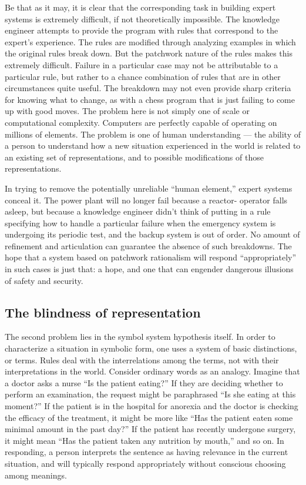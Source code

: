 \documentclass[12pt]{article}
\begin{document}
Be that as it may, it is clear that the corresponding task in building expert systems is extremely difficult, if not theoretically impossible. The knowledge engineer attempts to provide the program with rules that correspond to the expert's experience. The rules are modified through analyzing examples in which the original rules break down. But the patchwork nature of the rules makes this extremely difficult. Failure in a particular case may not be attributable to a particular rule, but rather to a chance combination of rules that are in other circumstances quite useful. The breakdown may not even provide sharp criteria for knowing what to change, as with a chess program that is just failing to come up with good moves. The problem here is not simply one of scale or computational complexity. Computers are perfectly capable of operating on millions of elements. The problem is one of human understanding --- the ability of a person to understand how a new situation experienced in the world is related to an existing set of representations, and to possible modifications of those representations.

In trying to remove the potentially unreliable ``human element,'' expert systems conceal it. The power plant will no longer fail because a reactor- operator falls asleep, but because a knowledge engineer didn't think of putting in a rule specifying how to handle a particular failure when the emergency system is undergoing its periodic test, and the backup system is out of order. No amount of refinement and articulation can guarantee the absence of such breakdowns. The hope that a system based on patchwork rationalism will respond ``appropriately'' in such cases is just that: a hope, and one that can engender dangerous illusions of safety and security.

\subsection{The blindness of representation}

The second problem lies in the symbol system hypothesis itself. In order to characterize a situation in symbolic form, one uses a system of basic distinctions, or terms. Rules deal with the interrelations among the terms, not with their interpretations in the world.
Consider ordinary words as an analogy. Imagine that a doctor asks a nurse ``Is the patient eating?'' If they are deciding whether to perform an examination, the request might be paraphrased ``Is she eating at this moment?'' If the patient is in the hospital for anorexia and the doctor is checking the efficacy of the treatment, it might be more like ``Has the patient eaten some minimal amount in the past day?'' If the patient has recently undergone surgery, it might mean ``Has the patient taken any nutrition by mouth,'' and so on. In responding, a person interprets the sentence as having relevance in the current situation, and will typically respond appropriately without conscious choosing among meanings.
\end{document}
